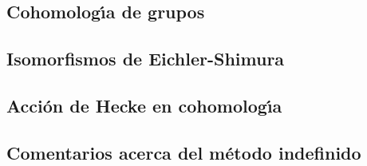 

\subsection{Cohomolog\'{\i}a de grupos}\label{subsec:cohomologiadegrupos}

\subsection{Isomorfismos de Eichler-Shimura}%
	\label{subsec:isodeeichlershimura}

\subsection{Acci\'{o}n de Hecke en cohomolog\'{\i}a}%
	\label{subsec:heckeencohomologia}

\subsection{Comentarios acerca del m\'{e}todo indefinido}%
	\label{subsec:comentariosindefinido}


